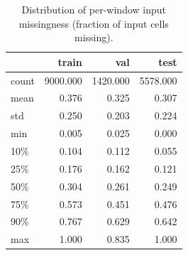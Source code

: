 \begin{table}
\caption{Distribution of per-window input missingness (fraction of input cells missing).}
\label{tab:window_input_missingness}
\begin{tabular}{lrrr}
\toprule
 & train & val & test \\
\midrule
count & 9000.000 & 1420.000 & 5578.000 \\
mean & 0.376 & 0.325 & 0.307 \\
std & 0.250 & 0.203 & 0.224 \\
min & 0.005 & 0.025 & 0.000 \\
10\% & 0.104 & 0.112 & 0.055 \\
25\% & 0.176 & 0.162 & 0.121 \\
50\% & 0.304 & 0.261 & 0.249 \\
75\% & 0.573 & 0.451 & 0.476 \\
90\% & 0.767 & 0.629 & 0.642 \\
max & 1.000 & 0.835 & 1.000 \\
\bottomrule
\end{tabular}
\end{table}
